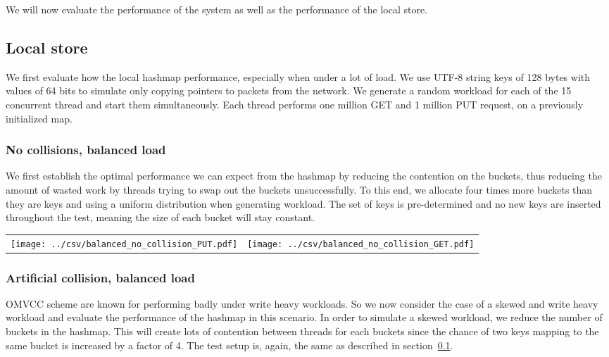 \documentclass[11pt]{book}
\begin{document}
We will now evaluate the performance of the system as well as the
performance of the local store.


\subsection{Local store}
\label{sec:eval-local}

We first evaluate how the local hashmap performance, especially when
under a lot of load. We use UTF-8 string keys of 128 bytes with values
of 64 bits to simulate only copying pointers to packets from the
network. We generate a random workload for each of the 15 concurrent
thread and start them simultaneously. Each thread performs one million
GET and 1 million PUT request, on a previously initialized map.

\subsubsection{No collisions, balanced load}

We first establish the optimal performance we can expect from the
hashmap by reducing the contention on the buckets, thus reducing the
amount of wasted work by threads trying to swap out the buckets
unsuccessfully. To this end, we allocate four times more buckets than
they are keys and using a uniform distribution when generating
workload. The set of keys is pre-determined and no new keys are
inserted throughout the test, meaning the size of each bucket will
stay constant.

\begin{center}
  \begin{tabular}{c c} \label{table:nocol-balanced}
    \texttt{[image: ../csv/balanced\_no\_collision\_PUT.pdf]}
    &
      \texttt{[image: ../csv/balanced\_no\_collision\_GET.pdf]}
  \end{tabular}
\end{center}

\subsubsection{Artificial collision, balanced load}

OMVCC scheme are known for performing badly under write heavy
workloads. So we now consider the case of a skewed and write heavy
workload and evaluate the performance of the hashmap in this
scenario. In order to simulate a skewed workload, we reduce the number
of buckets in the hashmap. This will create lots of contention between
threads for each buckets since the chance of two keys mapping to the
same bucket is increased by a factor of 4. The test setup is, again,
the same as described in section~\ref{sec:eval-local}.
\end{document}
